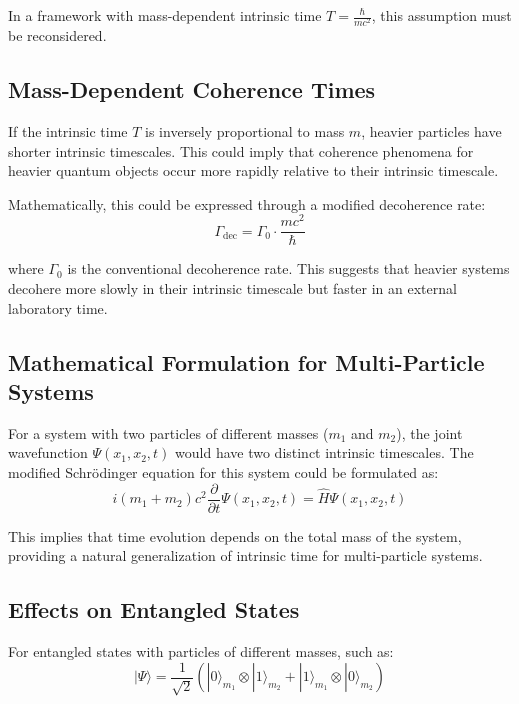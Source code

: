 \documentclass{article}
\begin{document}
	In a framework with mass-dependent intrinsic time $T = \frac{\hbar}{mc^2}$, this assumption must be reconsidered.
	
	\subsection{Mass-Dependent Coherence Times}
	
	If the intrinsic time $T$ is inversely proportional to mass $m$, heavier particles have shorter intrinsic timescales. This could imply that coherence phenomena for heavier quantum objects occur more rapidly relative to their intrinsic timescale.
	
	Mathematically, this could be expressed through a modified decoherence rate:
	\begin{equation}
		\Gamma_{\text{dec}} = \Gamma_0 \cdot \frac{mc^2}{\hbar}
	\end{equation}
	
	where $\Gamma_0$ is the conventional decoherence rate. This suggests that heavier systems decohere more slowly in their intrinsic timescale but faster in an external laboratory time.
	
	\subsection{Mathematical Formulation for Multi-Particle Systems}
	
	For a system with two particles of different masses ($m_1$ and $m_2$), the joint wavefunction $\Psi(x_1, x_2, t)$ would have two distinct intrinsic timescales. The modified Schrödinger equation for this system could be formulated as:
	\begin{equation}
		i (m_1 + m_2) c^2 \frac{\partial}{\partial t} \Psi(x_1, x_2, t) = \hat{H} \Psi(x_1, x_2, t)
	\end{equation}
	
	This implies that time evolution depends on the total mass of the system, providing a natural generalization of intrinsic time for multi-particle systems.
	
	\subsection{Effects on Entangled States}
	
	For entangled states with particles of different masses, such as:
	\begin{equation}
		|\Psi\rangle = \frac{1}{\sqrt{2}}(|0\rangle_{m_1} \otimes |1\rangle_{m_2} + |1\rangle_{m_1} \otimes |0\rangle_{m_2})
	\end{equation}
	
\end{document}
